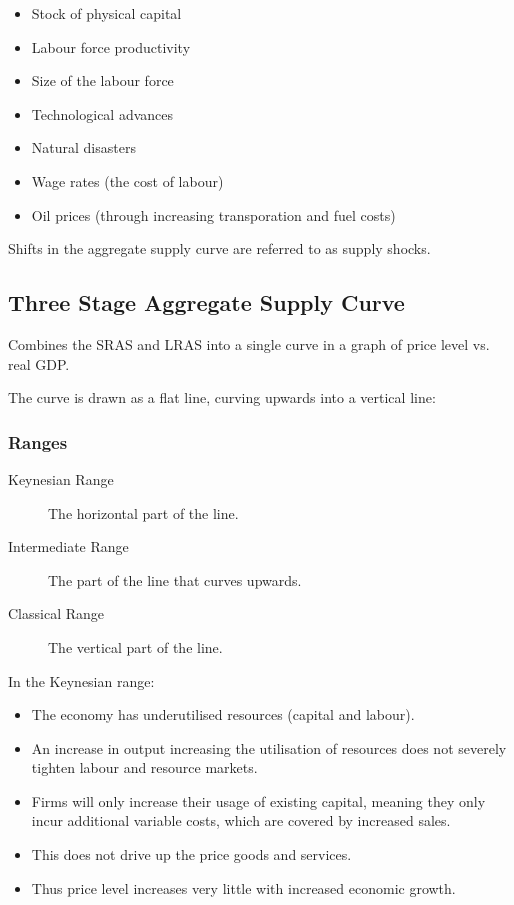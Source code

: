 \documentclass[a4paper,11pt]{article}
\begin{document}
\begin{itemize}
\item Stock of physical capital
\item Labour force productivity
\item Size of the labour force
\item Technological advances
\item Natural disasters
\item Wage rates (the cost of labour)
\item Oil prices (through increasing transporation and fuel costs)
\end{itemize}

Shifts in the aggregate supply curve are referred to as supply shocks.


\subsection{Three Stage Aggregate Supply Curve}

Combines the SRAS and LRAS into a single curve in a graph of price level vs.
real GDP.

The curve is drawn as a flat line, curving upwards into a vertical line:



\subsubsection{Ranges}

\begin{description}
\item [Keynesian Range] The horizontal part of the line.
\item [Intermediate Range] The part of the line that curves upwards.
\item [Classical Range] The vertical part of the line.
\end{description}

In the Keynesian range:

\begin{itemize}
\item The economy has underutilised resources (capital and labour).
\item An increase in output increasing the utilisation of resources does not
	severely tighten labour and resource markets.
\item Firms will only increase their usage of existing capital, meaning they
	only incur additional variable costs, which are covered by increased sales.
\item This does not drive up the price goods and services.
\item Thus price level increases very little with increased economic growth.
\end{itemize}
\end{document}
